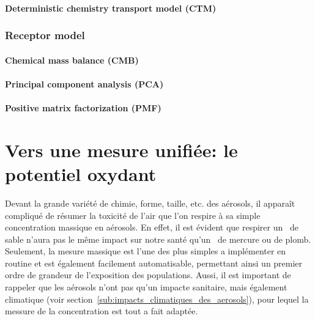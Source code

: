 \paragraph{Deterministic chemistry transport model (CTM)}%
\label{sub:deterministic_chemistry_transport_model_ctm_}

\subsubsection{Receptor model}%
\label{sec:receptor_model}

\paragraph{Chemical mass balance (CMB)}%
\label{sub:chemical_mass_balance_cmb_}

\paragraph{Principal component analysis (PCA)}%
\label{sub:principal_component_analysis_pca_}

\paragraph{Positive matrix factorization (PMF)}%
\label{sub:positive_matrix_factorization_pmf_}


\section{Vers une mesure unifiée: le potentiel oxydant}%
\label{sec:le_potentiel_oxydant_des_aerosols}

Devant la grande variété de chimie, forme, taille, etc. des aérosols, il apparaît
compliqué de résumer la toxicité de l'air que l'on respire à sa simple concentration
massique en aérosols. En effet, il est évident que respirer un~\ugm{} de sable n'aura pas
le même impact sur notre santé qu'un~\ugm{} de mercure ou de plomb.
Seulement, la mesure massique est l'une des plus simples a implémenter en routine et est
également facilement automatisable, permettant ainsi un premier ordre de grandeur de 
l'exposition des populations. Aussi, il est important de rappeler que les aérosols n'ont
pas qu'un impacte sanitaire, mais également climatique (voir
section~\ref{sub:impacts_climatiques_des_aerosols}), pour lequel la messure de la concentration est tout a
fait adaptée.

